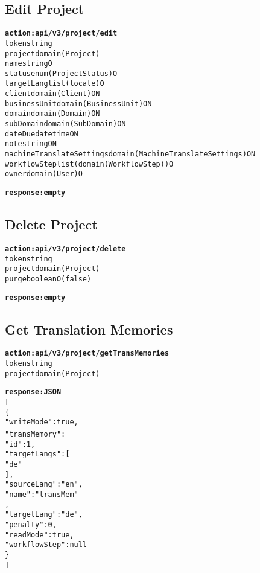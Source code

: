 \subsection{Edit Project}
\begin{alltt}
\textbf{action: api/v3/project/edit}
token                       string
project                     domain(Project)
name                        string                             O
status                      enum(ProjectStatus)                O
targetLang                  list(locale)                       O
client                      domain(Client)                     O N
businessUnit                domain(BusinessUnit)               O N
domain                      domain(Domain)                     O N
subDomain                   domain(SubDomain)                  O N
dateDue                     datetime                           O N
note                        string                             O N
machineTranslateSettings    domain(MachineTranslateSettings)   O N
workflowStep                list(domain(WorkflowStep))         O
owner                       domain(User)                       O

\textbf{response: empty}
\end{alltt}

\subsection{Delete Project}
\begin{alltt}
\textbf{action: api/v3/project/delete}
token                       string
project                     domain(Project)
purge                       boolean             O(false)

\textbf{response: empty}
\end{alltt}

\subsection{Get Translation Memories}
\begin{alltt}
\textbf{action: api/v3/project/getTransMemories}
token                       string
project                     domain(Project)

\textbf{response: JSON}
[
\{
	"writeMode":true,
	"transMemory":{
		"id":1,
		"targetLangs":[
		"de"
		],
		"sourceLang":"en",
		"name":"transMem"
	},
	"targetLang":"de",
	"penalty":0,
	"readMode":true,
	"workflowStep":null
\}
]
\end{alltt}

